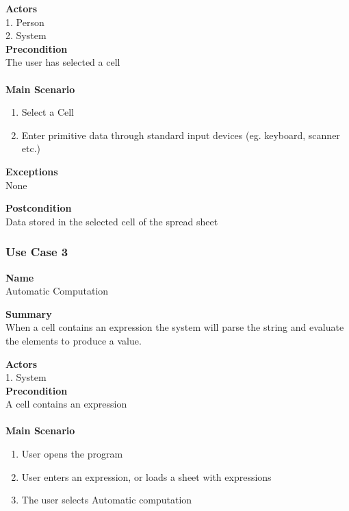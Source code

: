 \documentclass[12pt]{article}
\begin{document}
\noindent
{\bf Actors}\\
1. Person\\
2. System\\

\noindent
{\bf Precondition}\\
The user has selected a cell\\
\noindent\\

{\bf Main Scenario}\\
\vspace*{-0.2in}
\begin{enumerate}
\item Select a Cell
\item Enter primitive data through standard input devices (eg. keyboard, scanner etc.)
\end{enumerate}

\noindent
{\bf Exceptions}\\
None

\noindent
{\bf Postcondition}\\
Data stored in the selected cell of the spread sheet

\clearpage

\subsubsection{Use Case 3} \label{uc:3}

\noindent
{\bf Name}\\
Automatic Computation

\noindent
{\bf Summary}\\
When a cell contains an expression the system will parse the string and evaluate the elements to produce a value.

\noindent
{\bf Actors}\\
1. System\\

\noindent
{\bf Precondition}\\
A cell contains an expression\\
\noindent\\
{\bf Main Scenario}\\
\vspace*{-0.2in}
\begin{enumerate}
\item User opens the program
\item User enters an expression, or loads a sheet with expressions
\item The user selects Automatic computation
\end{enumerate}
\end{document}
